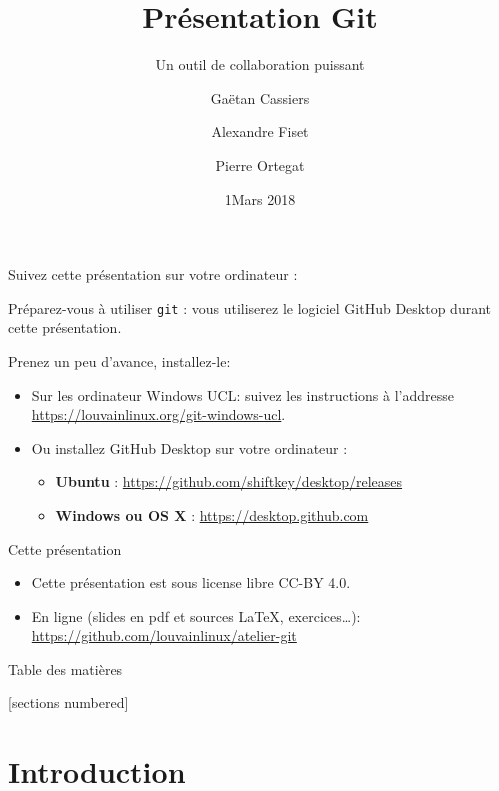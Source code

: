 \documentclass{beamer}
\title{Présentation Git}
\subtitle{Un outil de collaboration puissant}
\date{1\ier Mars 2018}
\author{Gaëtan Cassiers \and Alexandre Fiset \and Pierre Ortegat}
\institute{KAP Louvain-li-Nux}
\begin{document}
\begin{frame}
\begin{center}
  Suivez cette présentation sur votre ordinateur :

\end{center}

Préparez-vous à utiliser \texttt{git} :
vous utiliserez le logiciel GitHub Desktop durant cette présentation.

Prenez un peu d'avance, installez-le:
\begin{itemize}
    \item Sur les ordinateur Windows UCL: suivez les instructions à l'addresse \url{https://louvainlinux.org/git-windows-ucl}.
    \item Ou installez GitHub Desktop sur votre ordinateur :
    \begin{itemize}
        \item \textbf{Ubuntu} : {\footnotesize{\url{https://github.com/shiftkey/desktop/releases}}}
        \item \textbf{Windows ou OS X} : \url{https://desktop.github.com}
    \end{itemize}
\end{itemize}
\end{frame}


\maketitle

\begin{frame}{Cette présentation}
    \begin{itemize}
        \item Cette présentation est sous license libre CC-BY 4.0.
        \item En ligne (slides en pdf et sources \LaTeX, exercices\ldots):
            \url{https://github.com/louvainlinux/atelier-git}
    \end{itemize}
\end{frame}

\begin{frame}{Table des matières}

[sections numbered]
\tableofcontents[hideallsubsections]

\end{frame}

\section{Introduction}
\end{document}
